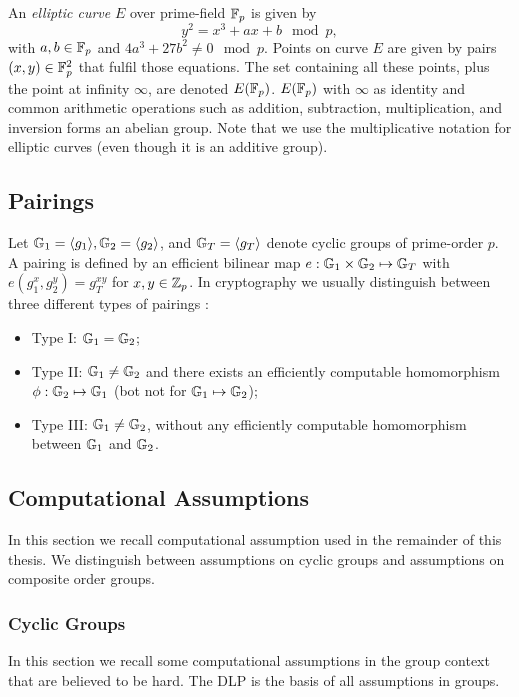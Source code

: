 An \emph{elliptic curve} $E$ over prime-field $\FF_p$ is given by 
\[
  y^2 = x^3 + ax + b \mod p,
\]
with $a,b\in\FF_p$ and $4a^3 + 27b^2 \not= 0 \mod p$.
Points on curve $E$ are given by pairs $(x,y)\in\FF^2_p$ that fulfil those equations.
The set containing all these points, plus the point at infinity $\infty$, are denoted $E(\FF_p)$.
$E(\FF_p)$ with $\infty$ as identity and common arithmetic operations such as addition, subtraction, multiplication, and inversion forms an abelian group.
Note that we use the multiplicative notation for elliptic curves (even though it is an additive group).

\subsection{Pairings}
Let $\GG_1=\genG[1], \GG_2=\genG[2]$, and $\GG_T=\genG[T]$ denote cyclic groups of prime-order $p$.
A pairing is defined by an efficient bilinear map $e: \GG_1 \times \GG_2 \mapsto \GG_T$ with $e(g_1^x, g_2^y) = g_T^{xy}$ for $x,y\in\ZZ_p$.
In cryptography we usually distinguish between three different types of pairings \cite{GalbraithPS08}:

\begin{itemize}
  \item Type I: $\GG_1 = \GG_2$;
  \item Type II: $\GG_1 \not= \GG_2$ and there exists an efficiently computable homomorphism $\phi: \GG_2 \mapsto \GG_1$ (bot not for $\GG_1 \mapsto \GG_2$);
  \item Type III: $\GG_1 \not= \GG_2$, without any efficiently computable homomorphism between $\GG_1$ and $\GG_2$.
\end{itemize}

\subsection{Computational Assumptions}
In this section we recall computational assumption used in the remainder of this thesis.
We distinguish between assumptions on cyclic groups and assumptions on composite order groups.


\subsubsection{Cyclic Groups}
In this section we recall some computational assumptions in the group context that are believed to be hard.
The \ac{DLP} is the basis of all assumptions in groups.

